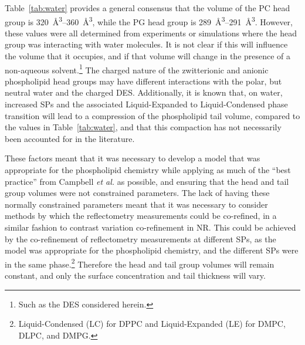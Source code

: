 Table~\ref{tab:water} provides a general consensus that the volume of the PC head group is \SIrange{320}{360}{\angstrom\cubed}, while the PG head group is \SIrange{289}{291}{\angstrom\cubed}.
However, these values were all determined from experiments\autocite{sun_order_1994,kucerka_determination_2004,balgavy_evaluation_2001,pan_molecular_2012} or simulations \autocite{armen_phospholipid_1998,kucerka_scattering_2012} where the head group was interacting with water molecules.
It is not clear if this will influence the volume that it occupies, and if that volume will change in the presence of a non-aqueous solvent.\footnote{Such as the DES considered herein.}
The charged nature of the zwitterionic and anionic phospholipid head groups may have different interactions with the polar, but neutral water and the charged DES.\autocite{sanchez-fernandez_self-assembly_2018}
Additionally, it is known that, on water, increased SPs and the associated Liquid-Expanded to Liquid-Condensed phase transition will lead to a compression of the phospholipid tail volume, compared to the values in Table~\ref{tab:water},\autocite{marsh_molecular_2010,small_lateral_1984} and that this compaction has not necessarily been accounted for in the literature.\autocite{campbell_structure_2018}

These factors meant that it was necessary to develop a model that was appropriate for the phospholipid chemistry while applying as much of the ``best practice'' from Campbell \emph{et al.}\autocite{campbell_structure_2018} as possible, and ensuring that the head and tail group volumes were not constrained parameters.
The lack of having these normally constrained parameters meant that it was necessary to consider methods by which the reflectometry measurements could be co-refined, in a similar fashion to contrast variation co-refinement in NR.
This could be achieved by the co-refinement of reflectometry measurements at different SPs, as the model was appropriate for the phospholipid chemistry, and the different SPs were in the same phase.\footnote{Liquid-Condensed (LC) for DPPC and Liquid-Expanded (LE) for DMPC, DLPC, and DMPG.}
Therefore the head and tail group volumes will remain constant, and only the surface concentration and tail thickness will vary.

